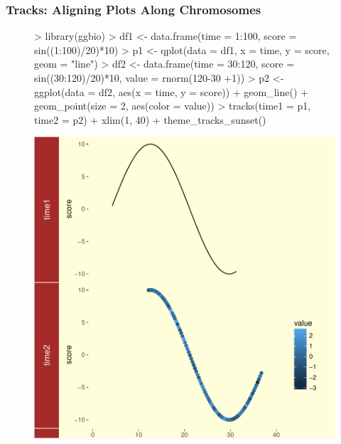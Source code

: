 \documentclass{beamer}
\begin{document}
\begin{frame}[containsverbatim]  
	\frametitle{Tracks: Aligning Plots Along Chromosomes}
\tiny 
\begin{figure}
  \centering
\begin{Schunk}
\begin{Sinput}
> library(ggbio)
> df1 <- data.frame(time = 1:100, score = sin((1:100)/20)*10)
> p1 <- qplot(data = df1, x = time, y = score, geom = "line")
> df2 <- data.frame(time = 30:120, score = sin((30:120)/20)*10, value = rnorm(120-30 +1))
> p2 <- ggplot(data = df2, aes(x = time, y = score)) + geom_line() + geom_point(size = 2, aes(color = value))
> tracks(time1 = p1, time2 = p2) + xlim(1, 40) + theme_tracks_sunset()
\end{Sinput}
\end{Schunk}
\includegraphics{fig--079}
\label{fig:tracks}
\end{figure}
\end{frame}
\end{document}
